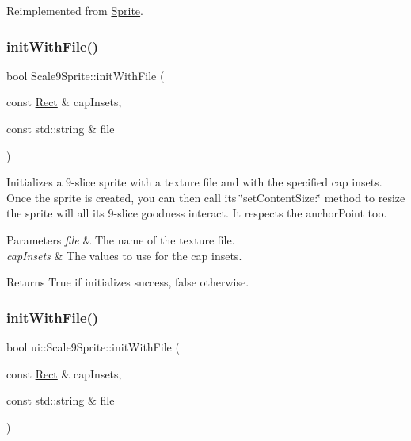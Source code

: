 Reimplemented from \hyperlink{classSprite_af94c86a971b4ebab60cdd884e8902c06}{Sprite}.

\mbox{\label{classui_1_1Scale9Sprite_aff4ec248f0baa654e23b4107147e770b}} 
\subsubsection{\texorpdfstring{init\+With\+File()}{initWithFile()}\hspace{0.1cm}{\footnotesize\ttfamily [4/8]}}
{\footnotesize\ttfamily bool Scale9\+Sprite\+::init\+With\+File (\begin{DoxyParamCaption}\item[{const \hyperlink{classRect}{Rect} \&}]{cap\+Insets,  }\item[{const std\+::string \&}]{file }\end{DoxyParamCaption})\hspace{0.3cm}{\ttfamily [virtual]}}

Initializes a 9-\/slice sprite with a texture file and with the specified cap insets. Once the sprite is created, you can then call its \char`\"{}set\+Content\+Size\+:\char`\"{} method to resize the sprite will all it\textquotesingle{}s 9-\/slice goodness interact. It respects the anchor\+Point too.


\begin{DoxyParams}{Parameters}
{\em file} & The name of the texture file. \\
\hline
{\em cap\+Insets} & The values to use for the cap insets. \\
\hline
\end{DoxyParams}
\begin{DoxyReturn}{Returns}
True if initializes success, false otherwise. 
\end{DoxyReturn}
\mbox{\label{classui_1_1Scale9Sprite_ae99c2fd664a255ea788cfc9d22ece8ac}} 
\subsubsection{\texorpdfstring{init\+With\+File()}{initWithFile()}\hspace{0.1cm}{\footnotesize\ttfamily [5/8]}}
{\footnotesize\ttfamily bool ui\+::\+Scale9\+Sprite\+::init\+With\+File (\begin{DoxyParamCaption}\item[{const \hyperlink{classRect}{Rect} \&}]{cap\+Insets,  }\item[{const std\+::string \&}]{file }\end{DoxyParamCaption})\hspace{0.3cm}{\ttfamily [virtual]}}

